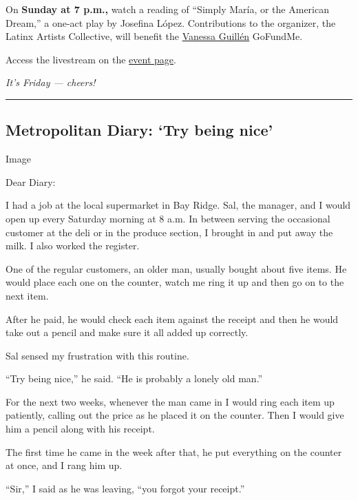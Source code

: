 On \textbf{Sunday at 7 p.m.,} watch a reading of ``Simply María, or the
American Dream,'' a one-act play by Josefina López. Contributions to the
organizer, the Latinx Artists Collective, will benefit the
\href{https://www.nytimes.com/article/vanessa-guillen-fort-hood.html}{Vanessa
Guillén} GoFundMe.

Access the livestream on the
\href{https://www.eventbrite.com/e/lac-presents-a-zoom-play-reading-of-simply-maria-or-the-american-dream-registration-114761127622}{event
page}.

\emph{It's Friday --- cheers!}

\begin{center}\rule{0.5\linewidth}{\linethickness}\end{center}

\hypertarget{metropolitan-diary-try-being-nice}{%
\subsection{Metropolitan Diary: `Try being
nice'}\label{metropolitan-diary-try-being-nice}}

Image

Dear Diary:

I had a job at the local supermarket in Bay Ridge. Sal, the manager, and
I would open up every Saturday morning at 8 a.m. In between serving the
occasional customer at the deli or in the produce section, I brought in
and put away the milk. I also worked the register.

One of the regular customers, an older man, usually bought about five
items. He would place each one on the counter, watch me ring it up and
then go on to the next item.

After he paid, he would check each item against the receipt and then he
would take out a pencil and make sure it all added up correctly.

Sal sensed my frustration with this routine.

``Try being nice,'' he said. ``He is probably a lonely old man.''

For the next two weeks, whenever the man came in I would ring each item
up patiently, calling out the price as he placed it on the counter. Then
I would give him a pencil along with his receipt.

The first time he came in the week after that, he put everything on the
counter at once, and I rang him up.

``Sir,'' I said as he was leaving, ``you forgot your receipt.''

